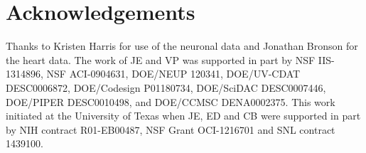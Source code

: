 \documentclass{egpubl}
\begin{document}
\section*{Acknowledgements}
Thanks to Kristen Harris for use of the neuronal data and Jonathan Bronson for the heart data. The work of JE and VP was supported in part by NSF IIS-1314896, NSF ACI-0904631, DOE/NEUP 120341, DOE/UV-CDAT DESC0006872, DOE/Codesign P01180734, DOE/SciDAC DESC0007446, DOE/PIPER DESC0010498, and DOE/CCMSC DENA0002375. This work initiated at the University of Texas when JE, ED  and CB were supported in part by NIH contract R01-EB00487, NSF Grant OCI-1216701 and SNL contract 1439100.


%

\balance

\end{document}

